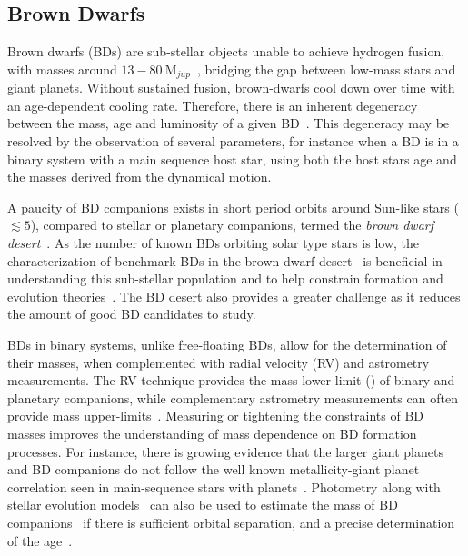 \subsection{Brown Dwarfs}
Brown dwarfs (BDs) are sub-stellar objects unable to achieve hydrogen fusion, with masses around \(13-80~\textrm{M}_{jup} \)~\citep{chabrier_theory_2000}, bridging the gap between low-mass stars and giant planets.
Without sustained fusion, brown-dwarfs cool down over time with an age-dependent cooling rate.
Therefore, there is an inherent degeneracy between the mass, age and luminosity of a given BD~\citep{burrows_nongray_1997}.
This degeneracy may be resolved by the observation of several parameters, for instance when a BD is in a binary system with a main sequence host star, using both the host stars age and the masses derived from the dynamical motion.

A paucity of BD companions exists in short period orbits around Sun-like stars (\(\lesssim5 \)\AU), compared to stellar or planetary companions, termed the \emph{brown dwarf desert}~\citep{halbwachs_exploring_2000, zucker_analysis_2001, sahlmann_search_2011}.
As the number of known BDs orbiting solar type stars is low, the characterization of benchmark BDs in the brown dwarf desert~\citep[e.g.][]{crepp_trends_2016} is beneficial in understanding this sub-stellar population and to help constrain formation and evolution theories~\citep{whitworth_formation_2007}.
The BD desert also provides a greater challenge as it reduces the amount of good BD candidates to study.

BDs in binary systems, unlike free-floating BDs, allow for the determination of their masses, when complemented with radial velocity ({RV}) and astrometry measurements.
The {RV} technique provides the mass lower-limit (\mtwosini{}) of binary and planetary companions, while complementary astrometry measurements can often provide mass upper-limits~\citep[e.g.][]{sahlmann_search_2011}.
Measuring or tightening the constraints of BD masses improves the understanding of mass dependence on BD formation processes.
For instance, there is growing evidence that the larger giant planets and BD companions do not follow the well known metallicity-giant planet correlation seen in main-sequence stars with planets~\citep[e.g.][]{santos_spectroscopic_2004,santos_observational_2017, maldonado_searching_2017}.
Photometry along with stellar evolution models~\citep[e.g.][]{baraffe_evolutionary_2003,allard_btsettl_2013} can also be used to estimate the mass of BD companions~\citep[e.g.][]{moutou_eccentricity_2017} if there is sufficient orbital separation, and a precise determination of the age~\citep{soderblom_ages_2010}.




